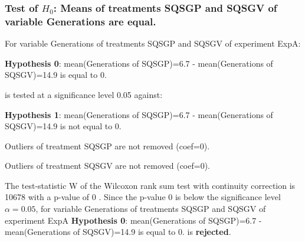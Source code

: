 \begin{frame}[t]
 \frametitle{Test of $H_{0}$: Means of treatments SQSGP and SQSGV of variable Generations are equal. }
 \scriptsize
 For variable Generations of treatments SQSGP and SQSGV of experiment ExpA:

\vspace{1mm}
{\bf Hypothesis 0}: mean(Generations of SQSGP)=6.7 - mean(Generations of SQSGV)=14.9 is equal to 0.


 \begin{center} is tested at a significance level 0.05 against: \end{center}

{\bf Hypothesis 1}: mean(Generations of SQSGP)=6.7 - mean(Generations of SQSGV)=14.9 is not equal to 0.
\vspace{1mm}
\vspace{1mm}

 Outliers of treatment SQSGP  are not removed (coef=0).

 Outliers of treatment SQSGV  are not removed (coef=0).
\vspace{1mm}
 
 The test-statistic W of the Wilcoxon rank sum test with continuity correction is 10678 with a p-value of 0 .
 Since the p-value 0 is below the significance level $\alpha= 0.05 $,
 for variable Generations of treatments SQSGP and SQSGV of experiment ExpA 
 {\bf Hypothesis 0}: mean(Generations of SQSGP)=6.7 - mean(Generations of SQSGV)=14.9 is equal to 0.
is {\bf rejected}.

 \end{frame}

